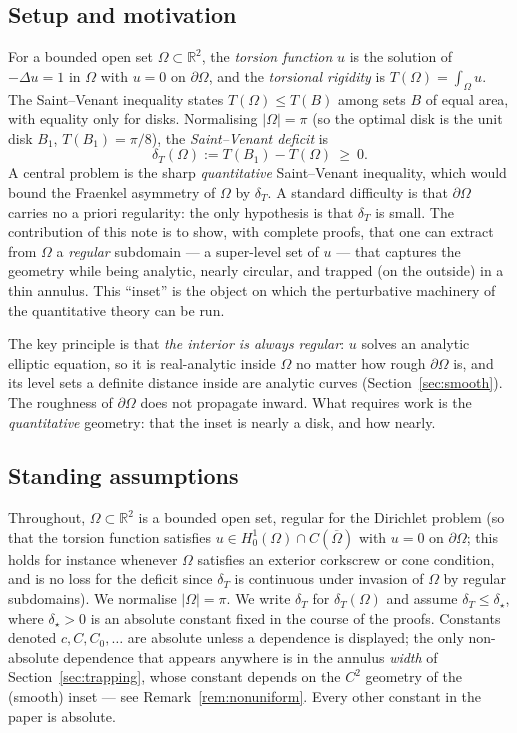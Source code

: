 \documentclass[11pt]{article}
\theoremstyle{definition}
\newcommand{\R}{\mathbb{R}}
\newcommand{\Om}{\Omega}
\newcommand{\dT}{\delta_T}
\begin{document}
\subsection*{Setup and motivation}
For a bounded open set $\Om\subset\R^2$, the \emph{torsion function} $u$ is
the solution of $-\Delta u=1$ in $\Om$ with $u=0$ on $\partial\Om$, and the
\emph{torsional rigidity} is $T(\Om)=\int_\Om u$. The Saint--Venant
inequality states $T(\Om)\le T(B)$ among sets $B$ of equal area, with
equality only for disks. Normalising $|\Om|=\pi$ (so the optimal disk is the
unit disk $B_1$, $T(B_1)=\pi/8$), the \emph{Saint--Venant deficit} is
\[
   \dT(\Om):=T(B_1)-T(\Om)\ \ge\ 0 .
\]
A central problem is the sharp \emph{quantitative} Saint--Venant
inequality, which would bound the Fraenkel asymmetry of $\Om$ by $\dT$. A
standard difficulty is that $\partial\Om$ carries no a priori regularity:
the only hypothesis is that $\dT$ is small. The contribution of this note is
to show, with complete proofs, that one can extract from $\Om$ a
\emph{regular} subdomain --- a super-level set of $u$ --- that captures the
geometry while being analytic, nearly circular, and trapped (on the outside)
in a thin annulus. This ``inset'' is the object on which the perturbative
machinery of the quantitative theory can be run.

The key principle is that \emph{the interior is always regular}: $u$ solves
an analytic elliptic equation, so it is real-analytic inside $\Om$ no matter
how rough $\partial\Om$ is, and its level sets a definite distance inside are
analytic curves (Section~\ref{sec:smooth}). The roughness of $\partial\Om$
does not propagate inward. What requires work is the \emph{quantitative}
geometry: that the inset is nearly a disk, and how nearly.

\subsection*{Standing assumptions}
Throughout, $\Om\subset\R^2$ is a bounded open set, regular for the
Dirichlet problem (so that the torsion function satisfies $u\in
H^1_0(\Om)\cap C(\overline\Om)$ with $u=0$ on $\partial\Om$; this holds for
instance whenever $\Om$ satisfies an exterior corkscrew or cone condition,
and is no loss for the deficit since $\dT$ is continuous under invasion of
$\Om$ by regular subdomains). We normalise $|\Om|=\pi$. We write $\dT$ for
$\dT(\Om)$ and assume $\dT\le\delta_\star$, where $\delta_\star>0$ is an
absolute constant fixed in the course of the proofs. Constants denoted
$c,C,C_0,\dots$ are absolute unless a dependence is displayed; the only
non-absolute dependence that appears anywhere is in the annulus
\emph{width} of Section~\ref{sec:trapping}, whose constant depends on the
$C^2$ geometry of the (smooth) inset --- see Remark~\ref{rem:nonuniform}.
Every other constant in the paper is absolute.
\end{document}
